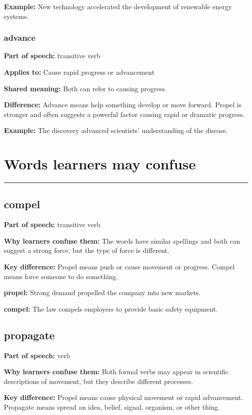 \documentclass[11pt]{article}
\newcommand{\sectionrule}{\par\vspace{-0.5em}\noindent\textcolor{Accent}{\rule{\linewidth}{0.6pt}}\par}
\begin{document}
\textbf{Example:} New technology accelerated the development of renewable energy systems.

\subsubsection{advance}
\textbf{Part of speech:} transitive verb

\textbf{Applies to:} Cause rapid progress or advancement

\textbf{Shared meaning:} Both can refer to causing progress.

\textbf{Difference:} Advance means help something develop or move forward. Propel is stronger and often suggests a powerful factor causing rapid or dramatic progress.

\textbf{Example:} The discovery advanced scientists' understanding of the disease.

\section{Words learners may confuse}
\sectionrule
\subsection{compel}
\textbf{Part of speech:} transitive verb

\textbf{Why learners confuse them:} The words have similar spellings and both can suggest a strong force, but the type of force is different.

\textbf{Key difference:} Propel means push or cause movement or progress. Compel means force someone to do something.

\textbf{propel:} Strong demand propelled the company into new markets.

\textbf{compel:} The law compels employers to provide basic safety equipment.

\subsection{propagate}
\textbf{Part of speech:} verb

\textbf{Why learners confuse them:} Both formal verbs may appear in scientific descriptions of movement, but they describe different processes.

\textbf{Key difference:} Propel means cause physical movement or rapid advancement. Propagate means spread an idea, belief, signal, organism, or other thing.
\end{document}
